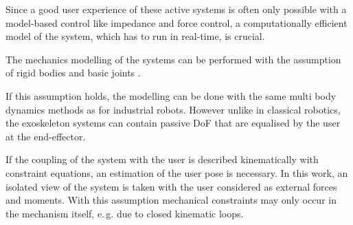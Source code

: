 \documentclass[twocolumn,10pt]{IFTOMM}
\begin{document}
Since a good user experience of these active systems is often only possible with a model-based control like impedance and force control, a computationally efficient model of the system, which has to run in real-time, is crucial.


The mechanics modelling of the systems can be performed with the assumption of rigid bodies and basic joints \cite{Pons2008}.

If this assumption holds, the modelling can be done with the same multi body dynamics methods as for industrial robots.
However unlike in classical robotics, the exoskeleton systems can contain passive DoF that are equalised by the user at the end-effector.

If the coupling of the system with the user is described kinematically with constraint equations, an estimation of the user pose is necessary.
In this work, an isolated view of the system is taken with the user considered as external forces and moments.
%
With this assumption mechanical constraints may only occur in the mechanism itself, e.\,g. due to closed kinematic loops.

\end{document}
